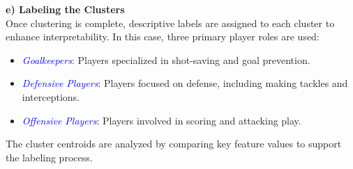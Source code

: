 \documentclass[a4paper,12pt]{article}
\begin{document}
\textbf{e) Labeling the Clusters} \\
Once clustering is complete, descriptive labels are assigned to each cluster to enhance interpretability. In this case, three primary player roles are used:
\begin{itemize}
    \item \textit{\textcolor{blue}{Goalkeepers}}: Players specialized in shot-saving and goal prevention.
    \item \textit{\textcolor{blue}{Defensive Players}}: Players focused on defense, including making tackles and interceptions.
    \item \textit{\textcolor{blue}{Offensive Players}}: 
    Players involved in scoring and attacking play.
\end{itemize}
The cluster centroids are analyzed by comparing key feature values to support the labeling process.
\end{document}
